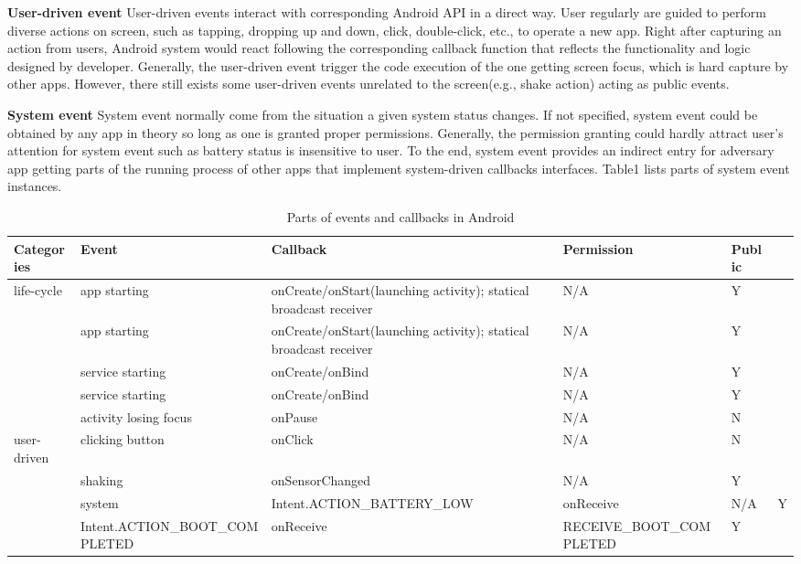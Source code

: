 \documentclass{sig-alternate-05-2015}
\begin{document}
\textbf{User-driven event} User-driven events interact with corresponding Android API in a direct way. User regularly are guided to perform diverse actions on screen, such as tapping, dropping up and down, click, double-click, etc., to operate a new app. Right after capturing an action from users, Android system would react following the  corresponding callback function that reflects the functionality and logic designed by developer. Generally, the user-driven event trigger the code execution of the one getting screen focus, which is hard capture by other apps. However, there still exists some user-driven events unrelated to the screen(e.g., shake action) acting as public events. 

\textbf{System event} System event normally come from the situation a given system status changes. If not specified, system event could be obtained by any app in theory so long as one is granted proper permissions. Generally, the permission granting could hardly attract user's attention for system event such as battery status is insensitive to user. To the end, system event provides an indirect entry for adversary app getting parts of the running process of other apps that implement system-driven callbacks interfaces. Table1 lists parts of system event instances.

\begin{table}[t]
\centering
 \caption{\label{tab:test}Parts of events and callbacks in Android}
 \begin{tabularx}{\linewidth}{XXXXX} 
  \toprule
  Categories & Event & Callback & Permission & Public \\
  \midrule
  life-cycle & app starting & onCreate/onStart(launching activity); statical broadcast receiver & N/A & Y\\
  			 & app starting & onCreate/onStart(launching activity); statical broadcast receiver & N/A & Y\\                      
             & service starting & onCreate/onBind & N/A & Y\\
             & service starting & onCreate/onBind & N/A & Y\\
             
             & activity losing focus & onPause & N/A & N\\
             
  user-driven & clicking button & onClick & N/A & N\\
              & shaking & onSensorChanged & N/A & Y\\
              & 
              
  system  & Intent.ACTION\_BATTERY\_LOW & onReceive & N/A & Y \\
          & Intent.ACTION\_BOOT\_COMPLETED & onReceive & RECEIVE\_BOOT\_COMPLETED & Y \\
  
  \bottomrule
 \end{tabularx}
\end{table}
\end{document}
